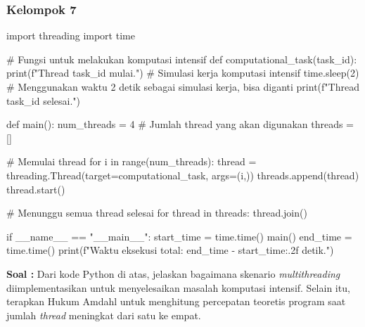\documentclass[12pt]{article}
\begin{document}
\subsubsection{Kelompok 7}
\begin{python}
    import threading
import time

# Fungsi untuk melakukan komputasi intensif
def computational_task(task_id):
    print(f"Thread {task_id} mulai.")
    # Simulasi kerja komputasi intensif
    time.sleep(2)  # Menggunakan waktu 2 detik sebagai simulasi kerja, bisa diganti
    print(f"Thread {task_id} selesai.")

def main():
    num_threads = 4  # Jumlah thread yang akan digunakan
    threads = []

    # Memulai thread
    for i in range(num_threads):
        thread = threading.Thread(target=computational_task, args=(i,))
        threads.append(thread)
        thread.start()

    # Menunggu semua thread selesai
    for thread in threads:
        thread.join()

if __name__ == "__main__":
    start_time = time.time()
    main()
    end_time = time.time()
    print(f"Waktu eksekusi total: {end_time - start_time:.2f} detik.")
\end{python}

\textbf{Soal : }
Dari kode Python di atas, jelaskan bagaimana skenario \textit{multithreading} diimplementasikan untuk menyelesaikan masalah komputasi intensif. Selain itu, terapkan Hukum Amdahl untuk menghitung percepatan teoretis program saat jumlah \textit{thread} meningkat dari satu ke empat. \\
\end{document}
